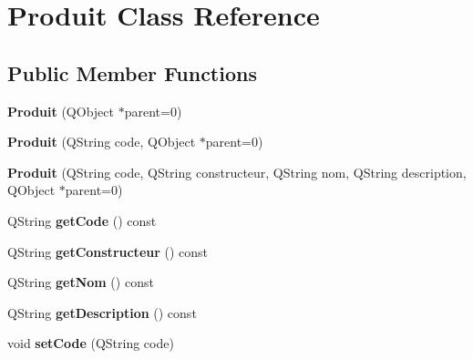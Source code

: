 \hypertarget{class_produit}{
\section{Produit Class Reference}
\label{da/db9/class_produit}
}
\subsection*{Public Member Functions}
\begin{DoxyCompactItemize}
\item 
\hypertarget{class_produit_afdd31f8217342cf98d1b0a0612777127}{
{\bfseries Produit} (QObject $\ast$parent=0)}
\label{da/db9/class_produit_afdd31f8217342cf98d1b0a0612777127}

\item 
\hypertarget{class_produit_a96a6eef1c04e1662f8cc33432594de15}{
{\bfseries Produit} (QString code, QObject $\ast$parent=0)}
\label{da/db9/class_produit_a96a6eef1c04e1662f8cc33432594de15}

\item 
\hypertarget{class_produit_af6cc96a0203af35fad57858495012bb8}{
{\bfseries Produit} (QString code, QString constructeur, QString nom, QString description, QObject $\ast$parent=0)}
\label{da/db9/class_produit_af6cc96a0203af35fad57858495012bb8}

\item 
\hypertarget{class_produit_aecf46c16362add086f0bb1531b695c23}{
QString {\bfseries getCode} () const }
\label{da/db9/class_produit_aecf46c16362add086f0bb1531b695c23}

\item 
\hypertarget{class_produit_a82da5f8efa1405c36b1380ee399921b5}{
QString {\bfseries getConstructeur} () const }
\label{da/db9/class_produit_a82da5f8efa1405c36b1380ee399921b5}

\item 
\hypertarget{class_produit_a4cb3c7edf6856a560e9088596b6b0b45}{
QString {\bfseries getNom} () const }
\label{da/db9/class_produit_a4cb3c7edf6856a560e9088596b6b0b45}

\item 
\hypertarget{class_produit_a0d6c0e6ca3c76fcdd03b5783d043be3b}{
QString {\bfseries getDescription} () const }
\label{da/db9/class_produit_a0d6c0e6ca3c76fcdd03b5783d043be3b}

\item 
\hypertarget{class_produit_adafca55c25ea2bee065557a95ed9ee08}{
void {\bfseries setCode} (QString code)}
\label{da/db9/class_produit_adafca55c25ea2bee065557a95ed9ee08}


\end{DoxyCompactItemize}
